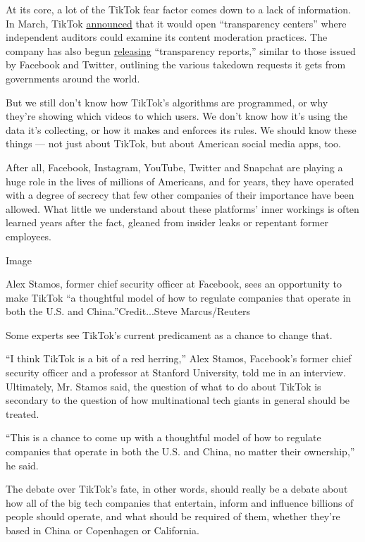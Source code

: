 At its core, a lot of the TikTok fear factor comes down to a lack of
information. In March, TikTok
\href{https://newsroom.tiktok.com/en-us/tiktok-to-launch-transparency-center-for-moderation-and-data-practices}{announced}
that it would open ``transparency centers'' where independent auditors
could examine its content moderation practices. The company has also
begun
\href{https://newsroom.tiktok.com/en-us/our-h-2-2019-transparency-report}{releasing}
``transparency reports,'' similar to those issued by Facebook and
Twitter, outlining the various takedown requests it gets from
governments around the world.

But we still don't know how TikTok's algorithms are programmed, or why
they're showing which videos to which users. We don't know how it's
using the data it's collecting, or how it makes and enforces its rules.
We should know these things --- not just about TikTok, but about
American social media apps, too.

After all, Facebook, Instagram, YouTube, Twitter and Snapchat are
playing a huge role in the lives of millions of Americans, and for
years, they have operated with a degree of secrecy that few other
companies of their importance have been allowed. What little we
understand about these platforms' inner workings is often learned years
after the fact, gleaned from insider leaks or repentant former
employees.

Image

Alex Stamos, former chief security officer at Facebook, sees an
opportunity to make TikTok ``a thoughtful model of how to regulate
companies that operate in both the U.S. and China.''Credit...Steve
Marcus/Reuters

Some experts see TikTok's current predicament as a chance to change
that.

``I think TikTok is a bit of a red herring,'' Alex Stamos, Facebook's
former chief security officer and a professor at Stanford University,
told me in an interview. Ultimately, Mr. Stamos said, the question of
what to do about TikTok is secondary to the question of how
multinational tech giants in general should be treated.

``This is a chance to come up with a thoughtful model of how to regulate
companies that operate in both the U.S. and China, no matter their
ownership,'' he said.

The debate over TikTok's fate, in other words, should really be a debate
about how all of the big tech companies that entertain, inform and
influence billions of people should operate, and what should be required
of them, whether they're based in China or Copenhagen or California.

